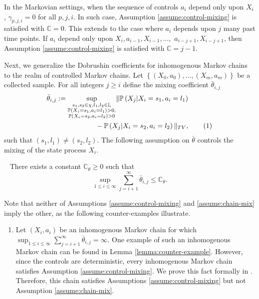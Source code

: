 \documentclass[opre,sglanonrev]{informs4}
\numberwithin{equation}{section}
\newcommand{\lp}{\left(}
\newcommand{\rp}{\right)}
\newcommand{\Cbb}{\mathbb{C}}
\newcommand{\Ibb}{\mathbb{I}}
\newcommand{\Pbb}{\mathbb{P}}
\newcommand{\constant}{\Cbb}
\newcommand{\indexeddata}{\left\{(X_0,a_0),\dots,(X_m,a_m)\right\}}
\newcommand\numberthis{\addtocounter{equation}{1}\tag{\theequation}}
\newcommand{\prob}{\Pbb}
\newcommand{\probl}{\prob}
\begin{document}
{{\begin{assumption}
\end{assumption}
\begin{remark}
In the Markovian settings, when the sequence of controls $a_i$ depend only upon $X_i$,
$
 \gamma_{p,j,i}=0
$
for all $p,j,i$. In such case, Assumption \ref{assume:control-mixing} is satisfied with $\constant=0$. This extends to the case where $a_i$ depends upon $j$ many past time points. If $a_i$ depend only upon $X_i,a_{i-1},X_{i-1},\dots,$ $a_{i-j+1},X_{i-j+1}$, then Assumption  \ref{assume:control-mixing} is satisfied with $\constant=j-1$. 
\end{remark}
{Next, we generalize the Dobrushin coefficients \citep{dobrushin1956central,dobrushin1956centralII,mukhamedov2013dobrushin} for inhomogenous Markov chains to the realm of controlled Markov chains.} Let $\indexeddata$ be a collected sample.
For all integers $j\geq i$ define the mixing coefficient $\bar\theta_{i,j}$
\begin{align*}
& \bar \theta_{i,j}:= \underset{\substack{s_1,s_2\in\chi,l_1,l_2\in \Ibb,\\ \prob(X_i=s_1,a_i=l_1)>0,\\ \prob(X_i=s_2,a_i=l_2)>0  }}{\sup}  \| \probl\lp X_j|X_i=s_1,a_i=l_1\rp\\
&\qquad\qquad\qquad\quad-\probl\lp X_j|X_i=s_2,a_i=l_2\rp \|_{TV},\numberthis\label{eq:def-theta}
\end{align*}
such that $(s_1,l_1)\neq(s_2,l_2)$. 
{ The following assumption on $\bar\theta$ controls the mixing of the state process $X_i$.}
\begin{assumption}~\label{assume:chain-mix} There exists a constant $\constant_{\theta}\geq 0$ such that
\[
\sup_{1\leq i\leq { \infty}}\sum_{j=i+1}^{{ \infty}} \bar \theta_{i,j}\leq\constant_{\theta}. 
\]
\end{assumption}
Note that neither of Assumptions \ref{assume:control-mixing} and \ref{assume:chain-mix} imply the other, as the following counter-examples illustrate.
\begin{enumerate}
    \item Let $(X_i,a_i)$ be an inhomogenous Markov chain for which  
    $
    \sup_{1\leq i\leq \infty}\sum_{j=i+1}^\infty \bar \theta_{i,j}=\infty.
    $
   {One example of such an inhomogenous Markov chain can be found in Lemma \ref{lemma:counter-example}}. However, since the controls are deterministic, every inhomogenous Markov chain satisfies Assumption \ref{assume:control-mixing}. We prove this fact formally in . Therefore, this chain satisfies Assumptions \ref{assume:control-mixing} but not Assumption \ref{assume:chain-mix}.

\end{enumerate}}}
\end{document}
